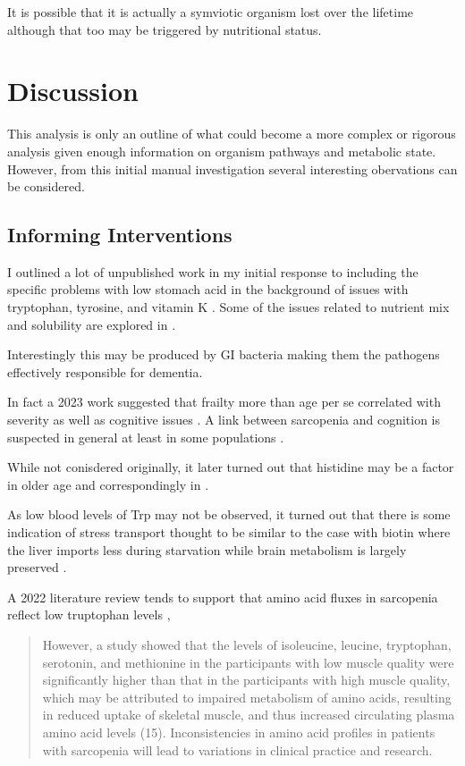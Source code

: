 \documentclass[aps,secnumarabic,balancelastpage,amsmath,amssymb,nofootinbib]{revtex4}
\begin{document}
It is possible that it is actually a symviotic organism lost
over the lifetime although that too may be triggered by nutritional
status. 

\section{Discussion  }

This analysis is only an outline of what could become
a more complex or rigorous analysis given enough
information on organism pathways and metabolic state.
However, from this initial manual investigation 
several interesting obervations can be considered.
\subsection{Informing Interventions   }


I outlined a lot of unpublished work in my initial
response to \mjmdisease including the
specific problems with low stomach acid
in the background of issues with tryptophan, tyrosine, and
vitamin K 
\cite{mmarchywka-MJM-2020-002-0.10}.
Some of the issues related to nutrient mix and solubility
are explored in 
\cite{marchywka-MJM-2022-009-0.50rg}
\cite{marchywka-MJM-2022-013-0.10}
\cite{marchywka-MJM-2021-014-0.80-rg}
\cite{marchywka-MJM-2021-018-0.50rg}
.

Interestingly this may be produced by GI bacteria 
making them the pathogens effectively
responsible for dementia. 


In fact a 2023 work suggested that frailty more
than age per se correlated with \mjmdisease severity
as well as cognitive issues
\cite{Matsumoto_Shibata_Kishi_Long_COVID_hypertension_2023}.
A link between sarcopenia and cognition is suspected
in general at least in some populations
\cite{PMC9965467}.

While not conisdered originally, it later turned out that
histidine may be a factor in older age and correspondingly
in \mjmdisease \cite{ mmarchywka-MJM-2021-007-.1-table-rg}.

As low blood levels of Trp may not be observed,
it turned out that there is some indication of
stress transport
\cite{ mmarchywka-MJM-2021-007-.1-table-rg}
thought to be similar to the case with biotin
where the liver imports less during starvation while
brain metabolism is largely preserved
\cite{PachecoAlvarez_SolorzanoVargas_Gravel_Paradoxical_Regulation_Biotin_2004}.

A  2022  literature review tends to support that amino acid
fluxes in sarcopenia reflect low truptophan levels
\cite{10.3389/fendo.2021.725518},
\begin{quote}
However, a study showed that the levels of isoleucine, leucine, tryptophan, serotonin, and methionine in the participants with low muscle quality were significantly higher than that in the participants with high muscle quality, which may be attributed to impaired metabolism of amino acids, resulting in reduced uptake of skeletal muscle, and thus increased circulating plasma amino acid levels (15). Inconsistencies in amino acid profiles in patients with sarcopenia will lead to variations in clinical practice and research.
\end{quote}
\end{document}
